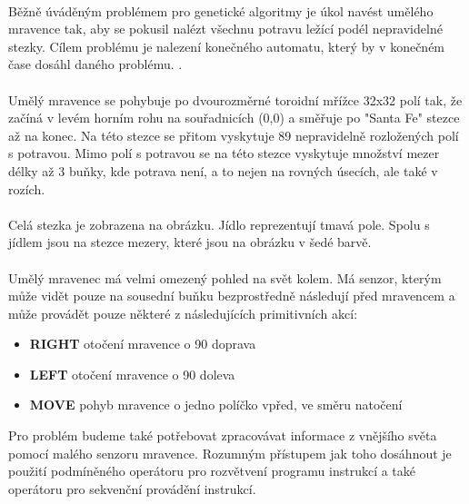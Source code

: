 \documentclass[bc,male,java,dept460]{diploma}		%
\begin{document}
\paragraph*{}
Běžně úváděným problémem pro genetické algoritmy je úkol navést umělého mravence tak, aby se pokusil nalézt všechnu potravu ležící podél nepravidelné stezky. Cílem problému je nalezení konečného automatu, který by v konečném čase dosáhl daného problému. \cite{gpcm}.

\paragraph*{}
Umělý mravence se pohybuje po dvourozměrné toroidní mřížce 32x32 polí tak, že začíná v levém horním rohu na souřadnicích (0,0) a směřuje po "Santa Fe" stezce až na konec. Na této stezce se přitom vyskytuje 89 nepravidelně rozložených polí s potravou. Mimo polí s potravou se na této stezce vyskytuje množství mezer délky až 3 buňky, kde potrava není, a to nejen na rovných úsecích, ale také v rozích.

\paragraph*{}
Celá stezka je zobrazena na obrázku. Jídlo reprezentují tmavá pole. Spolu s jídlem jsou na stezce mezery, které jsou na obrázku v šedé barvě.


\paragraph*{}
Umělý mravenec má velmi omezený pohled na svět kolem. Má senzor, kterým může vidět pouze na sousední buňku bezprostředně následují před mravencem a může provádět pouze některé z následujících primitivních akcí:

\begin{itemize}
\item \textbf{RIGHT} otočení mravence o 90 doprava
\item \textbf{LEFT} otočení mravence o 90 doleva
\item \textbf{MOVE} pohyb mravence o jedno políčko vpřed, ve směru natočení
\end{itemize}

Pro problém budeme také potřebovat zpracovávat informace z vnějšího světa pomocí malého senzoru mravence. Rozumným přístupem jak toho dosáhnout je použití podmíněného operátoru pro rozvětvení programu instrukcí a také operátoru pro sekvenční provádění instrukcí.
\end{document}
